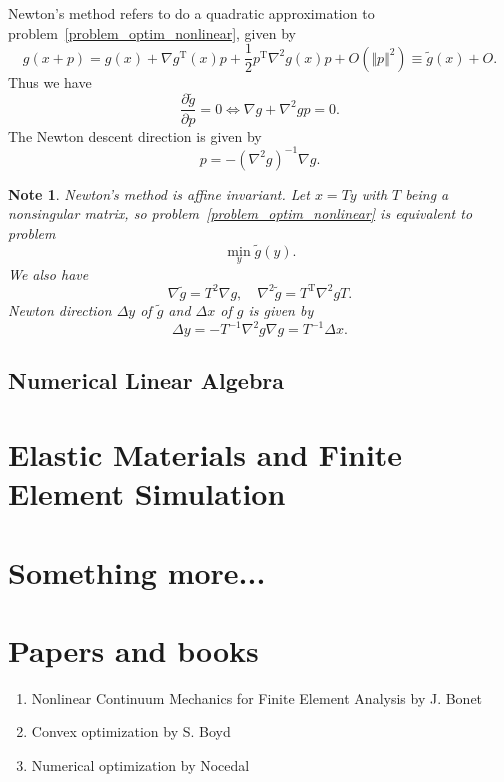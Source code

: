 \documentclass{fancydoc}
\newtheorem{note}{Note}
\newcommand{\trans}{\mathrm{T}}
\begin{document}
Newton's method refers to do a quadratic approximation to problem~\eqref{problem_optim_nonlinear}, given by
\begin{equation}
g(x + p) = g(x) + \nabla g^{\trans}(x)p + \frac{1}{2}p^\trans\nabla^2g(x)p + O(\Vert p\Vert^2) \equiv \tilde{g}(x) + O.
\end{equation}
Thus we have
\begin{equation*}
\frac{\partial \tilde{g}}{\partial p} = 0 \Longleftrightarrow \nabla g + \nabla^2 gp = 0.
\end{equation*}
The Newton descent direction is given by
\begin{equation*}
p = -(\nabla^2g)^{-1}\nabla g.
\end{equation*}
\bigbreak
\begin{note}
	Newton's method is affine invariant. Let $x=Ty$ with $T$ being a nonsingular matrix, so problem~\eqref{problem_optim_nonlinear} is equivalent to problem 
	\begin{equation}
	\min_{y} \tilde{g}(y).
	\end{equation}
	We also have 
	\begin{equation*}
	\nabla \tilde{g} = T^2 \nabla g, \quad \nabla^2 \tilde{g} = T^
	\trans \nabla^2 g T.
	\end{equation*}
	Newton direction $\Delta y$ of $\tilde{g}$ and $\Delta x$ of $g$ is given by
	\begin{equation*}
	\Delta y = -T^{-1}\nabla^2 g \nabla g = T^{-1} \Delta x.
	\end{equation*}
\end{note}


\subsection{Numerical Linear Algebra}

\section{Elastic Materials and Finite Element Simulation}

\section{Something more...}

\section{Papers and books}
\begin{enumerate}
	\item Nonlinear Continuum Mechanics for Finite Element Analysis by J. Bonet
	\item Convex optimization by S. Boyd
	\item Numerical optimization by Nocedal
\end{enumerate}
\end{document}
